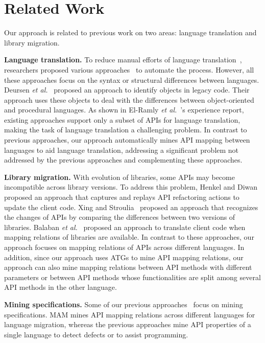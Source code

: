 \section{Related Work}
\label{sec:related}

Our approach is related to previous work on two areas:
language translation and library migration.

\textbf{Language translation.} To reduce manual efforts of language
translation~\cite{samet1981experience}, researchers proposed various
approaches~\cite{hassan2005lightweight,van1999identifying,waters1988program,mossienko2003automated,yasumatsu1995spice} to automate the process.
However, all these approaches focus on the syntax or structural differences between
languages. Deursen \emph{et al.}~\cite{van1999identifying} proposed an approach to identify
objects in legacy code. Their approach uses these objects to deal with the
differences between object-oriented and procedural languages. As
shown in El-Ramly \emph{et al.}~\cite{el2006experiment}'s experience
report, existing approaches support only a subset of APIs for language translation,
making the task of language translation a challenging problem.
In contrast to previous approaches, our approach automatically mines API mapping between
languages to aid language translation, addressing a significant
problem not addressed by the previous approaches and complementing
these approaches.

\textbf{Library migration.} With evolution of libraries, some APIs
may become incompatible across library versions. To address this
problem, Henkel and Diwan~\cite{henkel2005catchup} proposed an approach that captures
and replays API refactoring actions to update the client code.
Xing and Stroulia~\cite{xing2007api} proposed an approach that
recognizes the changes of APIs by comparing the differences between two
versions of libraries. Balaban \emph{et al.}~\cite{balaban2005refactoring} proposed
an approach to translate client code when mapping relations of libraries are
available. In contrast to these approaches, our approach focuses on
mapping relations of APIs across different languages. In addition, since
our approach uses ATGs to mine API mapping relations, our approach can also
mine mapping relations between API methods with different parameters or between
API methods whose functionalities are split among several API methods in the other language.

\textbf{Mining specifications.} Some of our previous approaches~\cite{zhong09:inferring,zhong09:mapo,thummalapenta09:mining,thummalapenta09:mseqgen,acharya09:mining} focus on mining specifications. MAM mines API mapping relations across different languages for language migration, whereas the previous approaches mine API properties of a single language to detect defects or to assist programming.
